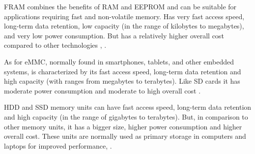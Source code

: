 \gls{FRAM} combines the benefits of \gls{RAM} and \gls{EEPROM} and can be suitable for applications requiring fast and non-volatile memory.
Has very fast access speed, long-term data retention, low capacity (in the range of kilobytes to megabytes), and very low power consumption.
But has a relatively higher overall cost compared to other technologies \cite{mem8}, \cite{mem11}.

As for \gls{eMMC}, normally found in smartphones, tablets, and other embedded systems, is characterized by its fast access speed, long-term data retention and high capacity (with ranges from megabytes to terabytes).
Like \gls{SD} cards it has moderate power consumption and moderate to high overall cost \cite{mem11}.

\gls{HDD} and \gls{SSD} memory units can have fast access speed, long-term data retention and high capacity (in the range of gigabytes to terabytes).
But, in comparison to other memory units, it has a bigger size, higher power consumption and higher overall cost.
These units are normally used as primary storage in computers and laptops for improved performance, \cite{mem10}.


